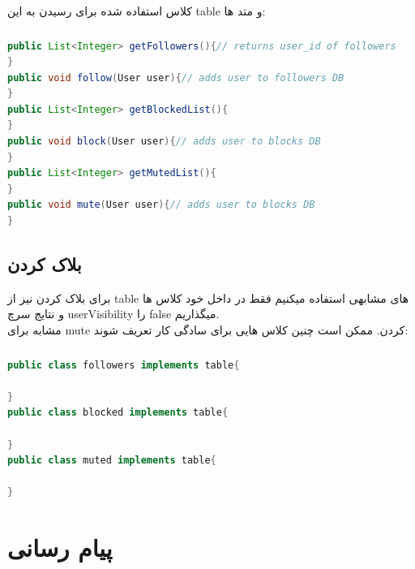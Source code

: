 \documentclass[12pt]{article}
\begin{document}
کلاس استفاده شده برای رسیدن به این table و متد ها:
\begin{latin}
    \subsubsection*{}
    \begin{lstlisting}[language=Java, caption={connections},label={lst:code}, mathescape=true, breaklines=true]
public List<Integer> getFollowers(){// returns user_id of followers
}
public void follow(User user){// adds user to followers DB
}
public List<Integer> getBlockedList(){
}
public void block(User user){// adds user to blocks DB
}
public List<Integer> getMutedList(){
}
public void mute(User user){// adds user to blocks DB
}
    \end{lstlisting}
\end{latin}
\subsection{بلاک کردن}
برای بلاک کردن نیز از table های مشابهی استفاده
میکنیم فقط در داخل خود کلاس ها و نتایج سرچ userVisibility
را false میگذاریم.\\
مشابه برای mute کردن.
ممکن است چنین کلاس هایی برای سادگی کار تعریف شوند:
\begin{latin}
    \subsubsection*{}
    \begin{lstlisting}[language=Java, caption={connections},label={lst:code}, mathescape=true, breaklines=true]
public class followers implements table{

}
public class blocked implements table{

}
public class muted implements table{

}
    \end{lstlisting}
\end{latin}
\pagebreak
\section{پیام رسانی}
\end{document}

